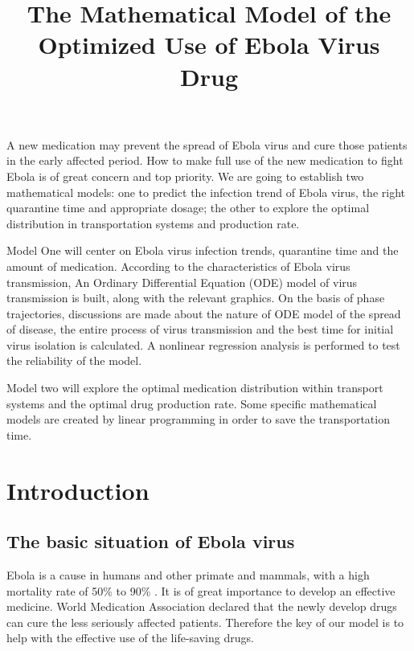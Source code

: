 \documentclass{icmmcm}
\title{The Mathematical Model of the Optimized Use of Ebola Virus Drug}
\begin{document}
\begin{summary}
A new medication may prevent the spread of Ebola virus and cure
 those patients in the early affected period. How to make full
 use of the new medication to fight Ebola is of great concern
 and top priority. We are going to establish two mathematical
 models: one to predict  the infection trend of Ebola virus, the
 right quarantine time and appropriate dosage; the other to
 explore the optimal distribution  in transportation systems and
production rate.
\par Model One will center on Ebola virus infection trends,
 quarantine time and the amount of medication. According to the
 characteristics of Ebola virus transmission, An Ordinary 
 Differential Equation (ODE) model of virus transmission is
 built, along with the relevant graphics. On the basis of phase
 trajectories, discussions are made about the nature of ODE
 model of the spread of disease, the entire process of virus
 transmission and the best time for initial virus isolation is
 calculated. A nonlinear regression analysis is performed to
 test the reliability of the model.
\par Model two will explore the optimal medication distribution
 within transport systems and the optimal drug production rate.
 Some specific mathematical models are created by linear
 programming in order to save the transportation time.
\end{summary}

\maketitle
\thispagestyle{fancy}


\section{Introduction}
\subsection{The basic situation of Ebola virus}
 Ebola is a cause in humans and other primate and mammals, with
 a high mortality rate of 50\% to 90\% \cite{bib1}. It is of
 great importance to develop an effective medicine. World
 Medication Association declared that the newly develop drugs
 can cure the less seriously affected patients. Therefore the
 key of our model is to help with the effective use of the
 life-saving drugs.
\end{document}
